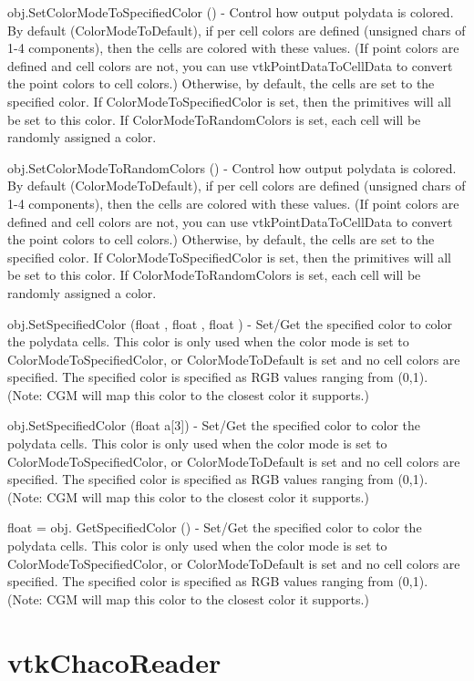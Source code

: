 \begin{DoxyItemize}
\item {\ttfamily obj.\-Set\-Color\-Mode\-To\-Specified\-Color ()} -\/ Control how output polydata is colored. By default (Color\-Mode\-To\-Default), if per cell colors are defined (unsigned chars of 1-\/4 components), then the cells are colored with these values. (If point colors are defined and cell colors are not, you can use vtk\-Point\-Data\-To\-Cell\-Data to convert the point colors to cell colors.) Otherwise, by default, the cells are set to the specified color. If Color\-Mode\-To\-Specified\-Color is set, then the primitives will all be set to this color. If Color\-Mode\-To\-Random\-Colors is set, each cell will be randomly assigned a color.  
\item {\ttfamily obj.\-Set\-Color\-Mode\-To\-Random\-Colors ()} -\/ Control how output polydata is colored. By default (Color\-Mode\-To\-Default), if per cell colors are defined (unsigned chars of 1-\/4 components), then the cells are colored with these values. (If point colors are defined and cell colors are not, you can use vtk\-Point\-Data\-To\-Cell\-Data to convert the point colors to cell colors.) Otherwise, by default, the cells are set to the specified color. If Color\-Mode\-To\-Specified\-Color is set, then the primitives will all be set to this color. If Color\-Mode\-To\-Random\-Colors is set, each cell will be randomly assigned a color.  
\item {\ttfamily obj.\-Set\-Specified\-Color (float , float , float )} -\/ Set/\-Get the specified color to color the polydata cells. This color is only used when the color mode is set to Color\-Mode\-To\-Specified\-Color, or Color\-Mode\-To\-Default is set and no cell colors are specified. The specified color is specified as R\-G\-B values ranging from (0,1). (Note\-: C\-G\-M will map this color to the closest color it supports.)  
\item {\ttfamily obj.\-Set\-Specified\-Color (float a\mbox{[}3\mbox{]})} -\/ Set/\-Get the specified color to color the polydata cells. This color is only used when the color mode is set to Color\-Mode\-To\-Specified\-Color, or Color\-Mode\-To\-Default is set and no cell colors are specified. The specified color is specified as R\-G\-B values ranging from (0,1). (Note\-: C\-G\-M will map this color to the closest color it supports.)  
\item {\ttfamily float = obj. Get\-Specified\-Color ()} -\/ Set/\-Get the specified color to color the polydata cells. This color is only used when the color mode is set to Color\-Mode\-To\-Specified\-Color, or Color\-Mode\-To\-Default is set and no cell colors are specified. The specified color is specified as R\-G\-B values ranging from (0,1). (Note\-: C\-G\-M will map this color to the closest color it supports.)  
\end{DoxyItemize}\hypertarget{vtkio_vtkchacoreader}{}\section{vtk\-Chaco\-Reader}\label{vtkio_vtkchacoreader}
